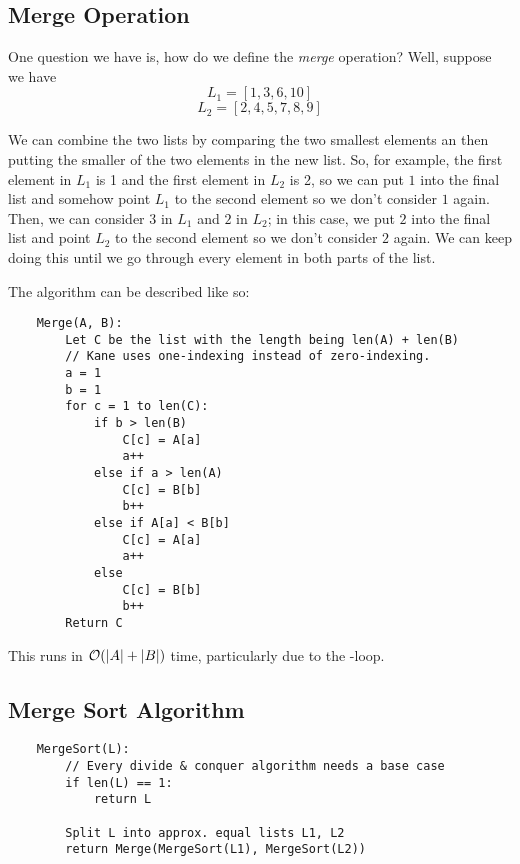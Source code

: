 \documentclass[letterpaper]{article}
\begin{document}
\subsection{Merge Operation}
One question we have is, how do we define the \emph{merge} operation? Well, suppose we have
\[L_1 = [1, 3, 6, 10]\]
\[L_2 = [2, 4, 5, 7, 8, 9]\]

We can combine the two lists by comparing the two smallest elements an then putting the smaller of the two elements in the new list. So, for example, the first element in $L_1$ is 1 and the first element in $L_2$ is 2, so we can put $1$ into the final list and somehow point $L_1$ to the second element so we don't consider $1$ again. Then, we can consider $3$ in $L_1$ and $2$ in $L_2$; in this case, we put $2$ into the final list and point $L_2$ to the second element so we don't consider $2$ again. We can keep doing this until we go through every element in both parts of the list. 

\bigskip 

The algorithm can be described like so: 
\begin{verbatim}
    Merge(A, B):
        Let C be the list with the length being len(A) + len(B)
        // Kane uses one-indexing instead of zero-indexing.
        a = 1 
        b = 1
        for c = 1 to len(C):
            if b > len(B)
                C[c] = A[a]
                a++ 
            else if a > len(A)
                C[c] = B[b]
                b++ 
            else if A[a] < B[b]
                C[c] = A[a]
                a++ 
            else 
                C[c] = B[b]
                b++ 
        Return C
\end{verbatim}
This runs in $\mathcal{O}(|A| + |B|)$ time, particularly due to the -loop. 

\subsection{Merge Sort Algorithm}
\begin{verbatim}
    MergeSort(L):
        // Every divide & conquer algorithm needs a base case 
        if len(L) == 1:
            return L
        
        Split L into approx. equal lists L1, L2
        return Merge(MergeSort(L1), MergeSort(L2))
\end{verbatim}
\end{document}
